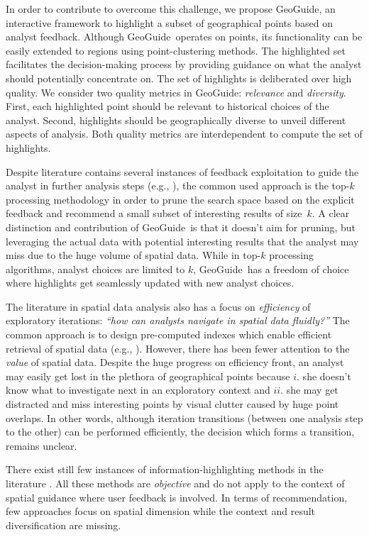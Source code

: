 \documentclass[conference,compsoc]{IEEEtran}
\newcommand{\framework}{{\sc GeoGuide}}
\begin{document}
In order to contribute to overcome this challenge, we  propose \framework, an interactive framework to highlight a subset of geographical points based on analyst feedback. Although \framework\ operates on points, its functionality can be easily extended to regions using point-clustering methods. The highlighted set facilitates the decision-making process by providing guidance on what the analyst should potentially concentrate on. The set of highlights is deliberated over high quality. We consider two quality metrics in \framework: {\em relevance} and {\em diversity}. First, each highlighted point should be relevant to historical choices of the analyst. Second, highlights should be geographically diverse to unveil different aspects of analysis. Both quality metrics are interdependent to compute the set of highlights.

Despite literature contains several instances of feedback exploitation to guide the analyst in further analysis steps (e.g., \cite{boley2013one}), the common used approach is the top-$k$ processing methodology in order to prune the search space based on the explicit feedback and recommend a small subset of interesting results of size~$k$. A clear distinction and contribution of \framework\ is that it doesn't aim for pruning, but leveraging the actual data with potential interesting results that the analyst may miss due to the huge volume of spatial data. While in top-$k$ processing algorithms, analyst choices are limited to $k$, \framework\ has a freedom of choice where highlights get seamlessly updated with new analyst choices. 


The literature in spatial data analysis also has a focus on {\em efficiency} of exploratory iterations: {\em ``how can analysts navigate in spatial data fluidly?''} The common approach is to design pre-computed indexes which enable efficient retrieval of spatial data (e.g., \cite{lins2013nanocubes}). However, there has been fewer attention to the {\em value} of spatial data. Despite the huge progress on efficiency front, an analyst may easily get lost in the plethora of geographical points because $i.$ she doesn't know what to investigate next in an exploratory context and $ii.$ she may get distracted and miss interesting points by visual clutter caused by huge point overlaps. In other words, although iteration transitions (between one analysis step to the other) can be performed efficiently, the decision which forms a transition, remains unclear.

There exist still few instances of information-highlighting methods in the literature \cite{Liang2010,Robinson2011,wongsuphasawat2016voyager,willett2007scented}. All these methods are {\em objective} and do not apply to the context of spatial guidance where user feedback is involved.  In terms of recommendation, few approaches focus on spatial dimension \cite{Bao2015,Levandoski:2012} while the context and result diversification are missing.
\end{document}
